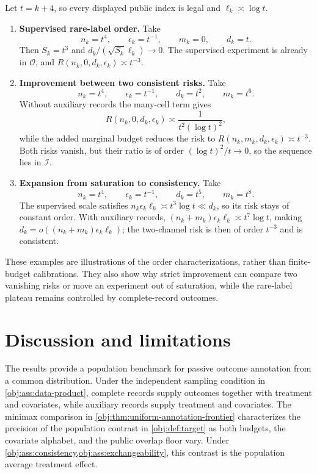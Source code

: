 \documentclass[11pt]{article}
\begin{document}
Let \(t=k+4\), so every displayed public index is legal and \(\ell_k\asymp\log t\).
\begin{enumerate}
\item \textbf{Supervised rare-label order.} Take
\[
n_k=t^4,\qquad \epsilon_k=t^{-1},\qquad m_k=0,\qquad d_k=t.
\]
Then \(S_k=t^3\) and \(d_k/(\sqrt{S_k}\ell_k)\to0\). The supervised experiment is already in \(\mathcal O\), and \(R(n_k,0,d_k,\epsilon_k)\asymp t^{-3}\).

\item \textbf{Improvement between two consistent risks.} Take
\[
n_k=t^4,\qquad \epsilon_k=t^{-1},\qquad d_k=t^2,\qquad m_k=t^6.
\]
Without auxiliary records the many-cell term gives
\[
R(n_k,0,d_k,\epsilon_k)\asymp \frac{1}{t^2(\log t)^2},
\]
while the added marginal budget reduces the risk to \(R(n_k,m_k,d_k,\epsilon_k)\asymp t^{-3}\). Both risks vanish, but their ratio is of order \((\log t)^2/t\to0\), so the sequence lies in \(\mathcal I\).

\item \textbf{Expansion from saturation to consistency.} Take
\[
n_k=t^4,\qquad \epsilon_k=t^{-1},\qquad d_k=t^5,\qquad m_k=t^8.
\]
The supervised scale satisfies \(n_k\epsilon_k\ell_k\asymp t^3\log t\ll d_k\), so its risk stays of constant order. With auxiliary records,
\((n_k+m_k)\epsilon_k\ell_k\asymp t^7\log t\), making
\(d_k=o((n_k+m_k)\epsilon_k\ell_k)\); the two-channel risk is then of order \(t^{-3}\) and is consistent.
\end{enumerate}

These examples are illustrations of the order characterizations, rather than finite-budget calibrations. They also show why strict improvement can compare two vanishing risks or move an experiment out of saturation, while the rare-label plateau remains controlled by complete-record outcomes.


\section{Discussion and limitations}

The results provide a population benchmark for passive outcome annotation from a common distribution. Under the independent sampling condition in \cref{obj:ass:data-product}, complete records supply outcomes together with treatment and covariates, while auxiliary records supply treatment and covariates. The minimax comparison in \cref{obj:thm:uniform-annotation-frontier} characterizes the precision of the population contrast in \cref{obj:def:target} as both budgets, the covariate alphabet, and the public overlap floor vary. Under \cref{obj:ass:consistency,obj:ass:exchangeability}, this contrast is the population average treatment effect.
\end{document}
